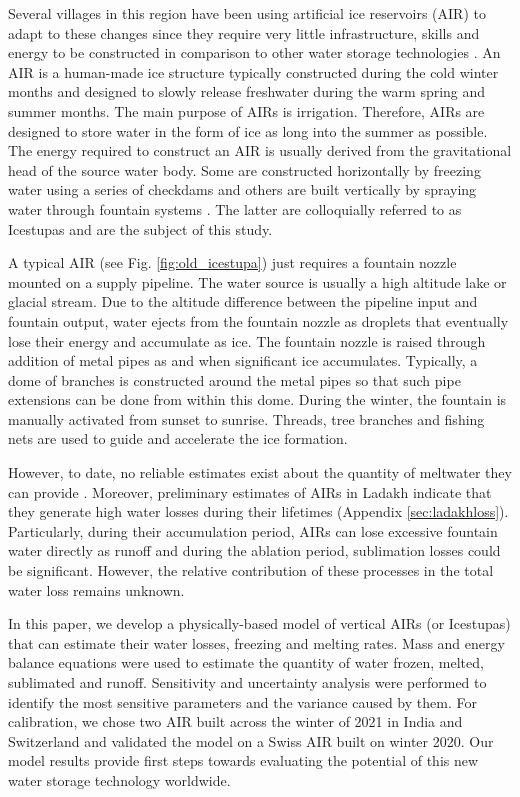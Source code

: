 \documentclass[utf8]{frontiersSCNS}
\begin{document}
Several villages in this region have been using artificial ice reservoirs (AIR) to adapt to these changes since
they require very little infrastructure, skills and energy to be constructed in comparison to other water
storage technologies \citep{IPCC_2019,10.1659/MRD-JOURNAL-D-18-00072.1, campaign}. An AIR is a human-made ice
structure typically constructed during the cold winter months and designed to slowly release freshwater during
the warm spring and summer months.  The main purpose of AIRs is irrigation. Therefore, AIRs are designed to
store water in the form of ice as long into the summer as possible. The energy required to construct an AIR is
usually derived from the gravitational head of the source water body. Some are constructed horizontally by
freezing water using a series of checkdams and others are built vertically by spraying water through fountain
systems \citep{Nusser_2018}. The latter are colloquially referred to as Icestupas and are the subject of this
study.

A typical AIR (see Fig. \ref{fig:old_icestupa}) just requires a fountain nozzle mounted on a supply pipeline. The water source is usually a high
altitude lake or glacial stream. Due to the altitude difference between the pipeline input and fountain output,
water ejects from the fountain nozzle as droplets that eventually lose their energy and accumulate as ice. The
fountain nozzle is raised through addition of metal pipes as and when significant ice accumulates.  Typically, a
dome of branches is constructed around the metal pipes so that such pipe extensions can be done from within this
dome. During the winter, the fountain is manually activated from sunset to sunrise.  Threads, tree branches and
fishing nets are used to guide and accelerate the ice formation.

However, to date, no reliable estimates exist about the quantity of meltwater they can provide
\citep{Nusser_2018} . Moreover, preliminary estimates of AIRs in Ladakh indicate that they generate high water
losses during their lifetimes (Appendix \ref{sec:ladakhloss}). Particularly, during their accumulation period,
AIRs can lose excessive fountain water directly as runoff and during the ablation period, sublimation losses
could be significant.  However, the relative contribution of these processes in the total water loss remains
unknown.

In this paper, we develop a physically-based model of vertical AIRs (or Icestupas) that can estimate their water
losses, freezing and melting rates. Mass and energy balance equations were used to estimate the quantity of
water frozen, melted, sublimated and runoff. Sensitivity and uncertainty analysis were performed to identify the
most sensitive parameters and the variance caused by them. For calibration, we chose two AIR built across the
winter of 2021 in India and Switzerland and validated the model on a Swiss AIR built on winter 2020. Our model
results provide first steps towards evaluating the potential of this new water storage technology worldwide.
\end{document}
